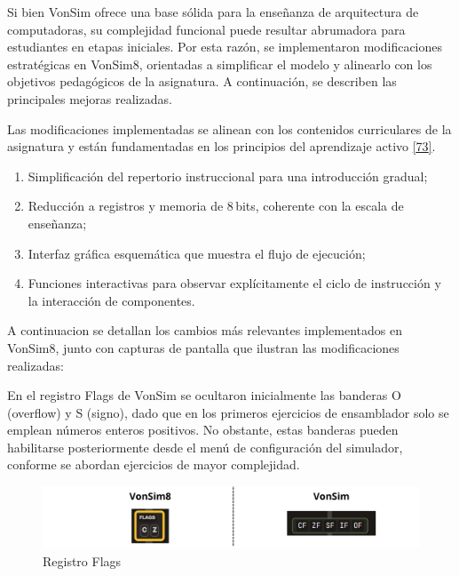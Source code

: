 \documentclass[12pt,oneside]{templates/unerthesis}
\providecommand{\tightlist}{%
  \setlength{\itemsep}{0pt}\setlength{\parskip}{0pt}}
\begin{document}
Si bien VonSim ofrece una base sólida para la enseñanza de arquitectura de computadoras, su complejidad funcional puede resultar abrumadora para estudiantes en etapas iniciales. Por esta razón, se implementaron modificaciones estratégicas en VonSim8, orientadas a simplificar el modelo y alinearlo con los objetivos pedagógicos de la asignatura. A continuación, se describen las principales mejoras realizadas.

Las modificaciones implementadas se alinean con los contenidos curriculares de la asignatura y están fundamentadas en los principios del aprendizaje activo \protect\hyperlink{ref-bonwell1991active}{{[}73{]}}.

\begin{enumerate}
\def\labelenumi{\arabic{enumi}.}
\tightlist
\item
  Simplificación del repertorio instruccional para una introducción gradual;
\item
  Reducción a registros y memoria de 8\,bits, coherente con la escala de enseñanza;
\item
  Interfaz gráfica esquemática que muestra el flujo de ejecución;
\item
  Funciones interactivas para observar explícitamente el ciclo de instrucción y la interacción de componentes.
\end{enumerate}

A continuacion se detallan los cambios más relevantes implementados en VonSim8, junto con capturas de pantalla que ilustran las modificaciones realizadas:

En el registro Flags de VonSim se ocultaron inicialmente las banderas O (overflow) y S (signo), dado que en los primeros ejercicios de ensamblador solo se emplean números enteros positivos. No obstante, estas banderas pueden habilitarse posteriormente desde el menú de configuración del simulador, conforme se abordan ejercicios de mayor complejidad.

\begin{figure}

{\centering \includegraphics[width=1\linewidth]{images/flags} 

}

\caption{Registro Flags}\label{fig:banderas}
\end{figure}
\end{document}
